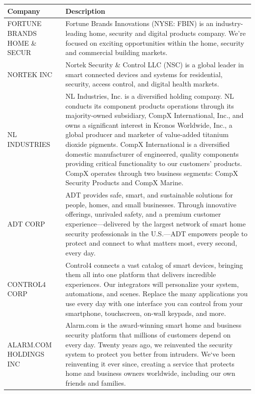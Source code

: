 \begin{tabular}{>{\raggedright\arraybackslash}p{3.5cm}>{\raggedright\arraybackslash}p{20cm}}
 Company & Description \\ 
  \midrule
FORTUNE BRANDS HOME \& SECUR & Fortune Brands Innovations (NYSE: FBIN) is an industry-leading home, security and digital products company. We’re focused on exciting opportunities within the home, security and commercial building markets. \\ 
   \midrule
NORTEK INC & Nortek Security \& Control LLC (NSC) is a global leader in smart connected devices and systems for residential, security, access control, and digital health markets. \\ 
   \midrule
NL INDUSTRIES & NL Industries, Inc. is a diversified holding company. NL conducts its component products operations through its majority-owned subsidiary, CompX International, Inc., and owns a significant interest in Kronos Worldwide, Inc., a global producer and marketer of value-added titanium dioxide pigments. CompX International is a diversified domestic manufacturer of engineered, quality components providing critical functionality to our customers’ products. CompX operates through two business segments: CompX Security Products and CompX Marine. \\ 
   \midrule
ADT CORP & ADT provides safe, smart, and sustainable solutions for people, homes, and small businesses. Through innovative offerings, unrivaled safety, and a premium customer experience—delivered by the largest network of smart home security professionals in the U.S.—ADT empowers people to protect and connect to what matters most, every second, every day. \\ 
   \midrule
CONTROL4 CORP & Control4 connects a vast catalog of smart devices, bringing them all into one platform that delivers incredible experiences. Our integrators will personalize your system, automations, and scenes. Replace the many applications you use every day with one interface you can control from your smartphone, touchscreen, on-wall keypads, and more. \\ 
   \midrule
ALARM.COM HOLDINGS INC & Alarm.com is the award-winning smart home and business security platform that millions of customers depend on every day. Twenty years ago, we reinvented the security system to protect you better from intruders. We`ve been reinventing it ever since, creating a service that protects home and business owners worldwide, including our own friends and families. \\ 

\end{tabular}

